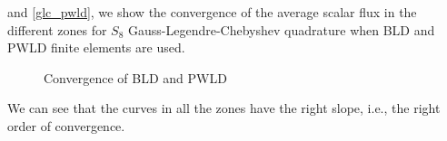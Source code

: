 and \ref{glc_pwld}, we show the convergence of the average scalar flux in the
different zones for $S_8$ Gauss-Legendre-Chebyshev quadrature when BLD and PWLD 
finite elements are used.
\begin{figure}[H]
  \centering
  \caption{Convergence of BLD and PWLD}
\end{figure}
We can see that the curves in all the zones have the right slope, i.e.,
the right order of convergence.
